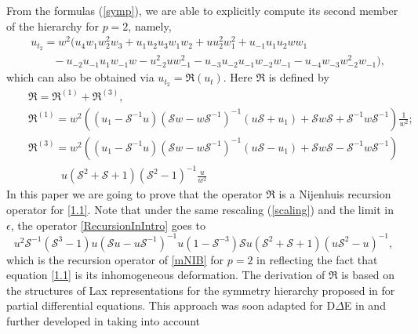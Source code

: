 \documentclass[fleqn,11pt,twoside]{article}
\theoremstyle{definition}
\begin{document}
From the formulas (\ref{symp}), we are able to explicitly compute its second member of the hierarchy for $p=2$, namely,
	\begin{equation}
		\begin{split}
			&u_{t_2} =w^2 (u_4 w_1 w_2^2 w_3+u_1 u_2 u_3 w_1 w_2+u u_2^2 w_1^2+u_{-1} u_1 u_2 w w_1 \\& \qquad
			-u_{-2} u_{-1} u_1 w_{-1} w-u_{-2}^2 u w_{-1}^2  -u_{-3} u_{-2} u_{-1} w_{-2} w_{-1}-u_{-4} w_{-3} w_{-2}^2 w_{-1}),
		\end{split} \label{5.9}
	\end{equation}
which can also be obtained via $u_{t_2}=\mathfrak{R} \left(u_t \right)$.
Here $\mathfrak{R}$ is defined by
	\begin{eqnarray}
			&& \mathfrak{R} =
\mathfrak{R}^{(1)}+\mathfrak{R}^{(3)},\label{RecursionInIntro}\\
			&& \mathfrak{R}^{(1)} =w^2 \left(\left( {u_1}- \mathcal{S}^{-1}
u\right) \left(\mathcal{S}w - w \mathcal{S}^{-1}\right)^{-1} \left(  u
\mathcal{S} + u_1\right)+\mathcal{S}w \mathcal{S}
+\mathcal{S}^{-1} w \mathcal{S}^{-1}\right)\frac{1}{w^2};\nonumber \\
			&& \mathfrak{R}^{(3)} =w^2\left(\left(
{u_1}-\mathcal{S}^{-1} u \right) \left(\mathcal{S}w - w
\mathcal{S}^{-1}\right)^{-1} \left(u \mathcal{S}-u_1\right) + \mathcal{S}
w\mathcal{S} -  \mathcal{S}^{-1}w \mathcal{S}^{-1}\right)\nonumber\\
&&\qquad \quad u\left(\mathcal{S}^2+\mathcal{S }+1\right) (\mathcal{S}^2-1)^{-1}\frac{u}{w^2} \nonumber
	\end{eqnarray}
In this paper we are going to prove that the operator $\mathfrak{R}$ is a Nijenhuis recursion operator for \eqref{1.1}. Note that under the same rescaling (\ref{scaling}) and the
limit in $\epsilon$, the operator \eqref{RecursionInIntro} goes to
\begin{equation*}
 u^2 \mathcal{S}^{-1}\left(\mathcal{S}^3 -1\right) u \left( \mathcal{S} u- u
\mathcal{S}^{-1}\right)^{-1} u\left(1 - \mathcal{S}^{-3}\right)
 \mathcal{S} u\left(\mathcal{S}^2+\mathcal{S}+1\right)\left(u \mathcal{S}^2-u
\right)^{-1},
	\end{equation*}
which is the recursion operator of \eqref{mNIB} for $p=2$ in \cite{7}
reflecting the fact that equation \eqref{1.1} is its inhomogeneous
deformation.
The derivation of $\mathfrak{R}$ is based on the structures of Lax
representations for the symmetry hierarchy proposed in
\cite{48}
for partial differential equations. This approach was soon adapted for
D$\Delta$E in \cite{58} and further developed in \cite{7,1} taking into account
\end{document}
